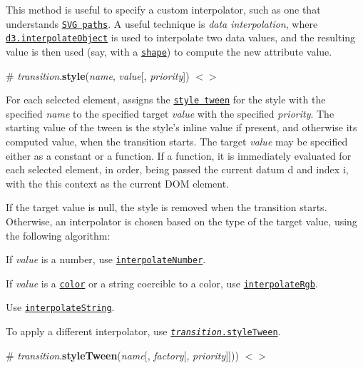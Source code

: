 This method is useful to specify a custom interpolator, such as one that understands \href{http://bl.ocks.org/mbostock/3916621}{\tt S\+VG paths}. A useful technique is {\itshape data interpolation}, where \href{https://github.com/d3/d3-interpolate#interpolateObject}{\tt d3.\+interpolate\+Object} is used to interpolate two data values, and the resulting value is then used (say, with a \href{https://github.com/d3/d3-shape}{\tt shape}) to compute the new attribute value.

\label{_transition_style}%
\# {\itshape transition}.{\bfseries style}({\itshape name}, {\itshape value}\mbox{[}, {\itshape priority}\mbox{]}) \href{https://github.com/d3/d3-transition/blob/master/src/transition/style.js}{\tt $<$$>$}

For each selected element, assigns the \href{#transition_styleTween}{\tt style tween} for the style with the specified {\itshape name} to the specified target {\itshape value} with the specified {\itshape priority}. The starting value of the tween is the style’s inline value if present, and otherwise its computed value, when the transition starts. The target {\itshape value} may be specified either as a constant or a function. If a function, it is immediately evaluated for each selected element, in order, being passed the current datum {\ttfamily d} and index {\ttfamily i}, with the {\ttfamily this} context as the current D\+OM element.

If the target value is null, the style is removed when the transition starts. Otherwise, an interpolator is chosen based on the type of the target value, using the following algorithm\+:


\begin{DoxyEnumerate}
\item If {\itshape value} is a number, use \href{https://github.com/d3/d3-interpolate#interpolateNumber}{\tt interpolate\+Number}.
\item If {\itshape value} is a \href{https://github.com/d3/d3-color#color}{\tt color} or a string coercible to a color, use \href{https://github.com/d3/d3-interpolate#interpolateRgb}{\tt interpolate\+Rgb}.
\item Use \href{https://github.com/d3/d3-interpolate#interpolateString}{\tt interpolate\+String}.
\end{DoxyEnumerate}

To apply a different interpolator, use \href{#transition_styleTween}{\tt {\itshape transition}.style\+Tween}.

\label{_transition_styleTween}%
\# {\itshape transition}.{\bfseries style\+Tween}({\itshape name}\mbox{[}, {\itshape factory}\mbox{[}, {\itshape priority}\mbox{]}\mbox{]})) \href{https://github.com/d3/d3-transition/blob/master/src/transition/styleTween.js}{\tt $<$$>$}

